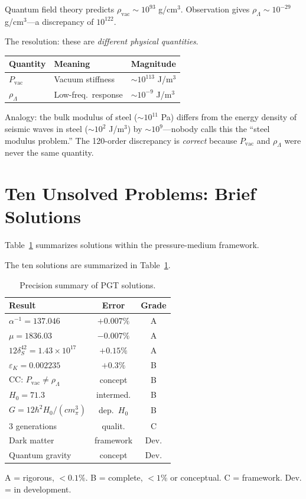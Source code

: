 \documentclass[12pt,a4paper,twocolumn]{article}
\newcommand{\dS}{\delta_{\!S}}
\newcommand{\Pvac}{P_{\mathrm{vac}}}
\begin{document}
Quantum field theory predicts $\rho_{\mathrm{vac}} \sim 10^{93}$ g/cm$^3$. Observation gives $\rho_\Lambda \sim 10^{-29}$ g/cm$^3$---a discrepancy of $10^{122}$.

The resolution: these are \emph{different physical quantities}.

\begin{center}
\small
\begin{tabular}{@{}lll@{}}
\toprule
Quantity & Meaning & Magnitude \\
\midrule
$\Pvac$ & Vacuum stiffness & $\sim10^{113}$ J/m$^3$ \\
$\rho_\Lambda$ & Low-freq.\ response & $\sim10^{-9}$ J/m$^3$ \\
\bottomrule
\end{tabular}
\end{center}

Analogy: the bulk modulus of steel ($\sim10^{11}$ Pa) differs from the energy density of seismic waves in steel ($\sim10^{2}$ J/m$^3$) by $\sim10^{9}$---nobody calls this the ``steel modulus problem.'' The 120-order discrepancy is \emph{correct} because $\Pvac$ and $\rho_\Lambda$ were never the same quantity.


\section{Ten Unsolved Problems: Brief Solutions}

Table~\ref{tab:problems} summarizes solutions within the pressure-medium framework.

The ten solutions are summarized in Table~\ref{tab:problems}.

\begin{table}[H]
\centering
\small
\caption{Precision summary of PGT solutions.}
\label{tab:problems}
\begin{tabular}{@{}lcc@{}}
\toprule
Result & Error & Grade \\
\midrule
$\alpha^{-1} = 137.046$ & $+0.007\%$ & A \\
$\mu = 1836.03$ & $-0.007\%$ & A \\
$12\dS^{42} = 1.43\!\times\!10^{17}$ & $+0.15\%$ & A \\
$\varepsilon_K = 0.002235$ & $+0.3\%$ & B \\
CC: $\Pvac\neq\rho_\Lambda$ & concept & B \\
$H_0 = 71.3$ & intermed. & B \\
$G = 12\hbar^2H_0/(cm_\pi^3)$ & dep.\ $H_0$ & B \\
3 generations & qualit. & C \\
Dark matter & framework & Dev. \\
Quantum gravity & concept & Dev. \\
\bottomrule
\end{tabular}
\vspace{2pt}

\raggedright\scriptsize A = rigorous, $<0.1\%$. B = complete, $<1\%$ or conceptual. C = framework. Dev. = in development.
\end{table}
\end{document}
